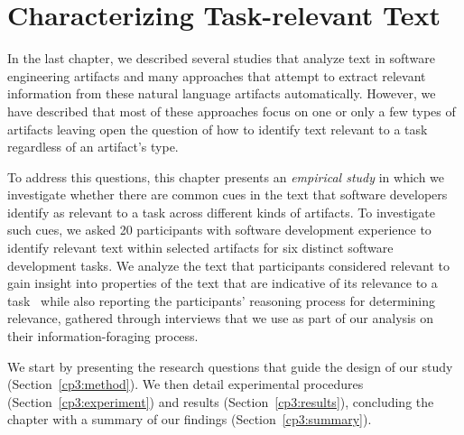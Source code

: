 \setcounter{chapter}{2}


\chapter{Characterizing Task-relevant Text}
\label{ch:characterizing}



In the last chapter,
we described several studies that analyze text in software engineering artifacts
and many approaches that attempt to extract relevant information from
these natural language artifacts automatically. However, 
we have described that
most of these approaches focus on 
one or only a 
few types of artifacts
leaving open the question of 
how to identify text relevant to a task regardless of an artifact's type.






To address this questions, 
this chapter presents an
\textit{empirical study} in which we
investigate whether 
there are common cues in the text
that software developers identify as relevant to a task across
different kinds of artifacts.
To investigate such cues, we 
asked 20 participants with
software development experience to identify relevant text within
selected artifacts for six distinct software development tasks.
We analyze the text that participants considered relevant 
to gain insight into properties of the text 
that are indicative of its relevance to a task~\cite{das2014frame, jurafsky2014speech}
while also reporting the participants'
reasoning process for determining relevance,
 gathered through interviews
that we use as part of our analysis on
their information-foraging process.



We start by presenting the research questions that guide 
the design of our study (Section~\ref{cp3:method}).
We then detail experimental procedures (Section~\ref{cp3:experiment}) 
and results (Section~\ref{cp3:results}),
concluding the chapter with a summary of our findings (Section~\ref{cp3:summary}).












